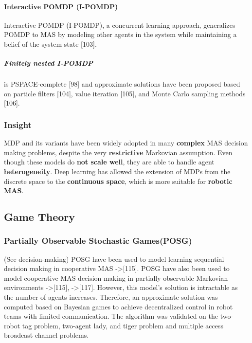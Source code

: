 \documentclass{article}
\begin{document}
				\paragraph{Interactive POMDP (I-POMDP)}Interactive POMDP (I-POMDP), a concurrent learning approach, generalizes POMDP to MAS by modeling other agents in the system while maintaining a belief of the system state \citet{rizk-2018-decision-making-in-multiagent-systems-a-survey}[103]. 
					\subparagraph{Finitely nested I-POMDP} is PSPACE-complete \citet{rizk-2018-decision-making-in-multiagent-systems-a-survey}[98] and approximate solutions have been proposed based on particle filters \citet{rizk-2018-decision-making-in-multiagent-systems-a-survey}[104], value iteration \citet{rizk-2018-decision-making-in-multiagent-systems-a-survey}[105], and Monte Carlo sampling methods \citet{rizk-2018-decision-making-in-multiagent-systems-a-survey}[106].
			\subsubsection{Insight}
				MDP and its variants have been widely adopted in many \textbf{complex} MAS decision making problems, despite the very  \textbf{restrictive} Markovian assumption. Even though these models do \textbf{not scale well}, they are able to handle agent \textbf{heterogeneity}. Deep learning has allowed the extension of MDPs from the discrete space to the \textbf{continuous space}, which is more suitable for \textbf{robotic MAS}.
				
				
		\subsection{Game Theory}
			\subsubsection{Partially Observable Stochastic Games(POSG)}
			(See decision-making)
			POSG have been used to model learning sequential decision making in cooperative MAS \citep{rizk-2018-decision-making-in-multiagent-systems-a-survey}->[115]. POSG have also been
			used to model cooperative MAS decision making in partially observable Markovian environments \citep{rizk-2018-decision-making-in-multiagent-systems-a-survey}->[115], \citep{rizk-2018-decision-making-in-multiagent-systems-a-survey}->[117]. 
			However, this model’s solution is intractable as the number of agents increases. Therefore, an approximate solution was computed based on Bayesian games to achieve decentralized control in robot teams with limited communication. The algorithm was validated on the two-robot tag problem, two-agent lady, and tiger problem and multiple access broadcast channel problems.
\end{document}
